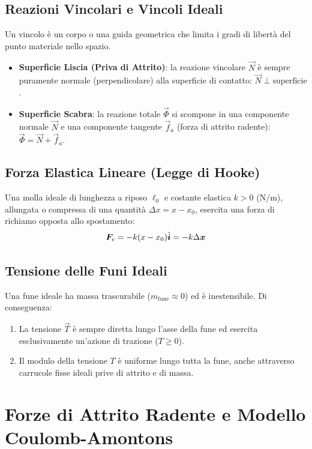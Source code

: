 \subsection{Reazioni Vincolari e Vincoli Ideali}
Un vincolo è un corpo o una guida geometrica che limita i gradi di libertà del punto materiale nello spazio.
\begin{itemize}
    \item \textbf{Superficie Liscia (Priva di Attrito)}: la reazione vincolare $\vec{N}$ è sempre puramente normale (perpendicolare) alla superficie di contatto: $\vec{N} \perp \text{superficie}$.
    \item \textbf{Superficie Scabra}: la reazione totale $\vec{\Phi}$ si scompone in una componente normale $\vec{N}$ e una componente tangente $\vec{f}_a$ (forza di attrito radente): $\vec{\Phi} = \vec{N} + \vec{f}_a$.
\end{itemize}

\subsection{Forza Elastica Lineare (Legge di Hooke)}
Una molla ideale di lunghezza a riposo $\ell_0$ e costante elastica $k > 0$ ($\si{\newton\per\metre}$), allungata o compressa di una quantità $\Delta x = x - x_0$, esercita una forza di richiamo opposta allo spostamento:
\begin{equation}
    \bm{F}_e = -k (x - x_0)\hat{\bm{i}} = -k \Delta\bm{x}
    \label{eq:hooke}
\end{equation}

\subsection{Tensione delle Funi Ideali}
Una fune ideale ha massa trascurabile ($m_{\text{fune}} \approx 0$) ed è inestensibile. Di conseguenza:
\begin{enumerate}
    \item La tensione $\vec{T}$ è sempre diretta lungo l'asse della fune ed esercita esclusivamente un'azione di trazione ($T \ge 0$).
    \item Il modulo della tensione $T$ è uniforme lungo tutta la fune, anche attraverso carrucole fisse ideali prive di attrito e di massa.
\end{enumerate}

\section{Forze di Attrito Radente e Modello Coulomb-Amontons}
\label{sec:attrito_radente}

